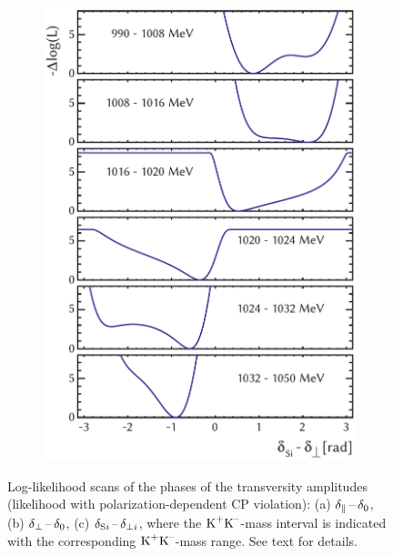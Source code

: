 \begin{figure}[tbp]
  \vspace*{0.02\textwidth}
  \begin{subfigure}{0.55\textwidth}
    \includegraphics[width=\textwidth]{graphics/results/NLL_polarDep_SWavePhases}
    \caption{}
    \label{fig:NLL_polarDep_transPhases_SWave}
  \end{subfigure}

  \caption{Log-likelihood scans of the phases of the transversity amplitudes (likelihood with polarization-dependent CP violation):
           (a) $\delparzero$, (b) $\delperpzero$,
           (c) $\delSperp[i]$, where the $\KK$-mass interval is indicated with the corresponding $\KK$-mass range.
           See text for details.}
  \label{fig:NLL_polarDep_transPhases}
\end{figure}

